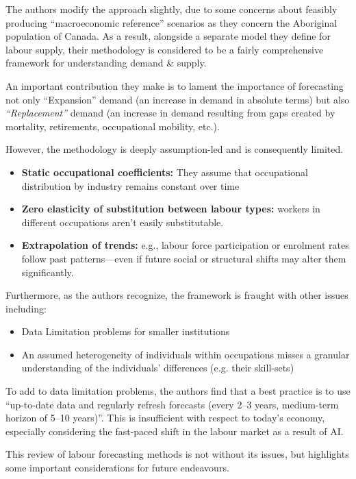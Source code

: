 The authors modify the approach slightly, due to some concerns about feasibly producing ``macroeconomic reference'' scenarios as they concern the Aboriginal population of Canada.
As a result, alongside a separate model they define for labour supply, their methodology is considered to be a fairly comprehensive framework for understanding demand \& supply.

An important contribution they make is to lament the importance of forecasting not only ``Expansion'' demand (an increase in demand in absolute terms) but also \emph{``Replacement''} demand (an increase in demand resulting from gaps created by mortality, retirements, occupational mobility, etc.).

However, the methodology is deeply assumption-led and is consequently limited.
\begin{itemize}
  \item \textbf{Static occupational coefficients:} They assume that occupational distribution by industry remains constant over time
  \item \textbf{Zero elasticity of substitution between labour types:}  workers in different occupations aren't easily substitutable.
  \item \textbf{Extrapolation of trends:} e.g., labour force participation or enrolment rates follow past patterns—even if future social or structural shifts may alter them significantly.
\end{itemize}

Furthermore, as the authors recognize, the framework is fraught with other issues including:
\begin{itemize}
  \item Data Limitation problems for smaller institutions
  \item An assumed heterogeneity of individuals within occupations misses a granular understanding of the individuals' differences (e.g. their skill-sets)
\end{itemize}

To add to data limitation problems, the authors find that a best practice is to use ``up-to-date data and regularly refresh forecasts (every 2–3 years, medium-term horizon of 5–10 years)''.
This is insufficient with respect to today's economy, especially considering the fast-paced shift in the labour market as a result of AI.

This review of labour forecasting methods is not without its issues, but highlights some important considerations for future endeavours.

